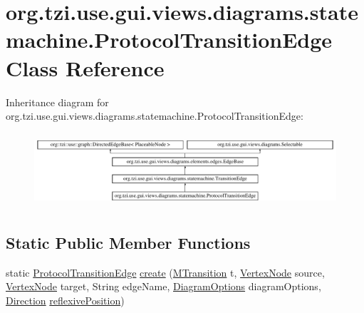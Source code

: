 \hypertarget{classorg_1_1tzi_1_1use_1_1gui_1_1views_1_1diagrams_1_1statemachine_1_1_protocol_transition_edge}{\section{org.\-tzi.\-use.\-gui.\-views.\-diagrams.\-statemachine.\-Protocol\-Transition\-Edge Class Reference}
\label{classorg_1_1tzi_1_1use_1_1gui_1_1views_1_1diagrams_1_1statemachine_1_1_protocol_transition_edge}
}
Inheritance diagram for org.\-tzi.\-use.\-gui.\-views.\-diagrams.\-statemachine.\-Protocol\-Transition\-Edge\-:\begin{figure}[H]
\begin{center}
\leavevmode
\includegraphics[height=2.779156cm]{classorg_1_1tzi_1_1use_1_1gui_1_1views_1_1diagrams_1_1statemachine_1_1_protocol_transition_edge}
\end{center}
\end{figure}
\subsection*{Static Public Member Functions}
\begin{DoxyCompactItemize}
\item 
static \hyperlink{classorg_1_1tzi_1_1use_1_1gui_1_1views_1_1diagrams_1_1statemachine_1_1_protocol_transition_edge}{Protocol\-Transition\-Edge} \hyperlink{classorg_1_1tzi_1_1use_1_1gui_1_1views_1_1diagrams_1_1statemachine_1_1_protocol_transition_edge_a13a0e22a6d7beeb8c2767ebc1d4a8019}{create} (\hyperlink{classorg_1_1tzi_1_1use_1_1uml_1_1mm_1_1statemachines_1_1_m_transition}{M\-Transition} t, \hyperlink{classorg_1_1tzi_1_1use_1_1gui_1_1views_1_1diagrams_1_1statemachine_1_1_vertex_node}{Vertex\-Node} source, \hyperlink{classorg_1_1tzi_1_1use_1_1gui_1_1views_1_1diagrams_1_1statemachine_1_1_vertex_node}{Vertex\-Node} target, String edge\-Name, \hyperlink{classorg_1_1tzi_1_1use_1_1gui_1_1views_1_1diagrams_1_1_diagram_options}{Diagram\-Options} diagram\-Options, \hyperlink{enumorg_1_1tzi_1_1use_1_1gui_1_1views_1_1diagrams_1_1util_1_1_direction}{Direction} \hyperlink{classorg_1_1tzi_1_1use_1_1gui_1_1views_1_1diagrams_1_1elements_1_1edges_1_1_edge_base_a3c4c59a344fe54ed87f8e637670930b5}{reflexive\-Position})
\end{DoxyCompactItemize}
